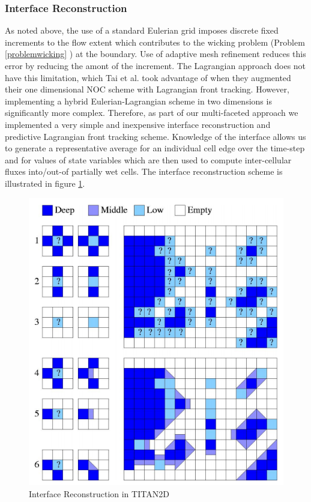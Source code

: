 \documentclass[letterpaper,10pt]{article}
\begin{document}
\subsubsection{Interface Reconstruction} \label{Interfacerecon}
As noted above, the use of a standard Eulerian grid imposes discrete 
fixed increments to the flow extent which contributes to the wicking problem
(Problem \ref{problemwicking} ) at the 
boundary.  Use of adaptive mesh refinement 
reduces this error by reducing the amont of the increment. 
The Lagrangian approach does not have this 
limitation, which Tai et al. \cite{Tai2002} took advantage
of when they augmented their one dimensional NOC scheme with 
Lagrangian front tracking.  However, implementing a hybrid 
Eulerian-Lagrangian scheme in two dimensions is significantly more 
complex. 
Therefore, as part of our multi-faceted approach we implemented a very 
simple and inexpensive interface reconstruction and predictive 
Lagrangian front tracking scheme.  Knowledge of the interface allows
us to generate a representative average for an individual cell edge 
over the time-step and for values of state variables which are then used to 
compute inter-cellular fluxes into/out-of partially wet cells.  The 
interface reconstruction scheme is illustrated in figure \ref{interface}.
\begin{figure}[!h]
        \centerline{\includegraphics[scale=0.3]{IMAGES/flux.png}}
        \caption{Interface Reconstruction in TITAN2D}
        \label{interface}
\end{figure} 
\end{document}
